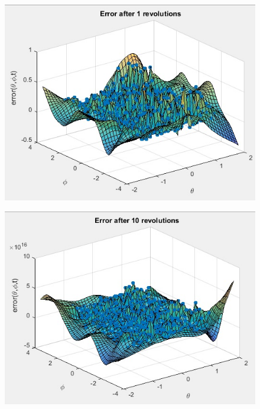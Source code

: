 \documentclass[11pt]{article}
\begin{document}
\begin{figure}[h!]
\centering
\begin{minipage}{.5\textwidth}
  \centering
\includegraphics[scale=0.7]{error1rev_FD.jpg}
\label{fig:global1rev}
\end{minipage}%

\begin{minipage}{.5\textwidth}
  \centering
\includegraphics[scale=0.7]{error10revFD.jpg}
\label{fig:global10rev}\
\end{minipage}
\end{figure}
\end{document}

